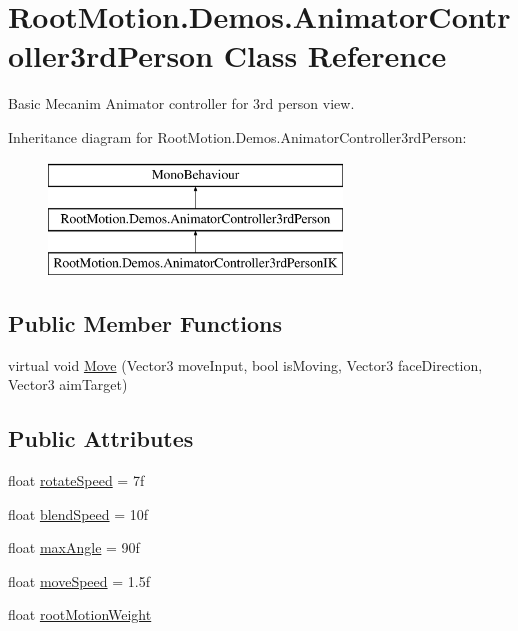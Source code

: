 \hypertarget{class_root_motion_1_1_demos_1_1_animator_controller3rd_person}{}\section{Root\+Motion.\+Demos.\+Animator\+Controller3rd\+Person Class Reference}
\label{class_root_motion_1_1_demos_1_1_animator_controller3rd_person}


Basic Mecanim Animator controller for 3rd person view.  


Inheritance diagram for Root\+Motion.\+Demos.\+Animator\+Controller3rd\+Person\+:\begin{figure}[H]
\begin{center}
\leavevmode
\includegraphics[height=3.000000cm]{class_root_motion_1_1_demos_1_1_animator_controller3rd_person}
\end{center}
\end{figure}
\subsection*{Public Member Functions}
\begin{DoxyCompactItemize}
\item 
virtual void \mbox{\hyperlink{class_root_motion_1_1_demos_1_1_animator_controller3rd_person_a95f02e7fc5456427e1d90f49db79a624}{Move}} (Vector3 move\+Input, bool is\+Moving, Vector3 face\+Direction, Vector3 aim\+Target)
\end{DoxyCompactItemize}
\subsection*{Public Attributes}
\begin{DoxyCompactItemize}
\item 
float \mbox{\hyperlink{class_root_motion_1_1_demos_1_1_animator_controller3rd_person_a63931bbe5b680337d739176fdc5cb449}{rotate\+Speed}} = 7f
\item 
float \mbox{\hyperlink{class_root_motion_1_1_demos_1_1_animator_controller3rd_person_a4b8db13f02856416ba46b36168b1b2cc}{blend\+Speed}} = 10f
\item 
float \mbox{\hyperlink{class_root_motion_1_1_demos_1_1_animator_controller3rd_person_a9de01e7ca3022d891b0df4b413b6f3d0}{max\+Angle}} = 90f
\item 
float \mbox{\hyperlink{class_root_motion_1_1_demos_1_1_animator_controller3rd_person_ab15cfc5ddea2b0c02502e5d12895ea37}{move\+Speed}} = 1.\+5f
\item 
float \mbox{\hyperlink{class_root_motion_1_1_demos_1_1_animator_controller3rd_person_abaa74f7dd0f32990a18110cfd0c7dbc0}{root\+Motion\+Weight}}
\end{DoxyCompactItemize}

